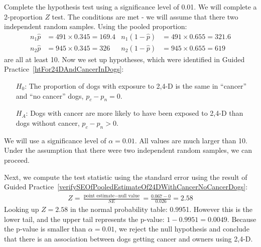 \begin{example}{Complete the hypothesis test using a significance level of 0.01.}
We will complete a 2-proportion $Z$ test. The conditions are met  - we will assume that there two independent random samples. Using the pooled proportion:
\begin{align*}
n_1\hat{p} &= 491 \times 0.345 = 169.4
	& n_1(1 - \hat{p}) &= 491 \times 0.655 = 321.6 \\
n_2\hat{p} &= 945 \times 0.345 = 326
	& n_2(1 - \hat{p}) &= 945 \times 0.655 = 619
\end{align*}
are all at least 10. Now we set up hypotheses, which were identified in Guided Practice~\ref{htFor24DAndCancerInDogs}:
\begin{itemize}
\item[$H_0$:] The proportion of dogs with exposure to 2,4-D is the same in ``cancer'' and ``no cancer'' dogs, $p_c - p_n = 0$.
\item[$H_A$:] Dogs with cancer are more likely to have been exposed to 2,4-D than dogs without cancer, $p_c - p_n > 0$.
\end{itemize}
We will use a significance level of $\alpha = 0.01$. All values are much larger than 10. Under the assumption that there were two independent random samples, we can proceed.

Next, we compute the test statistic using the standard error using the result of Guided Practice~\ref{verifySEOfPooledEstimateOf24DWithCancerNoCancerDogs}:
\begin{eqnarray*}
Z = \frac{\text{point estimate} - \text{null value}}{SE} = \frac{0.067 - 0}{0.026} = 2.58
\end{eqnarray*}
Looking up $Z=2.58$ in the normal probability table: 0.9951. However this is the lower tail, and the upper tail represents the p-value: $1-0.9951 = 0.0049$. Because the p-value is smaller than $\alpha = 0.01$, we reject the null hypothesis and conclude that there is an association between dogs getting cancer and owners using 2,4-D.
\end{example}
 
